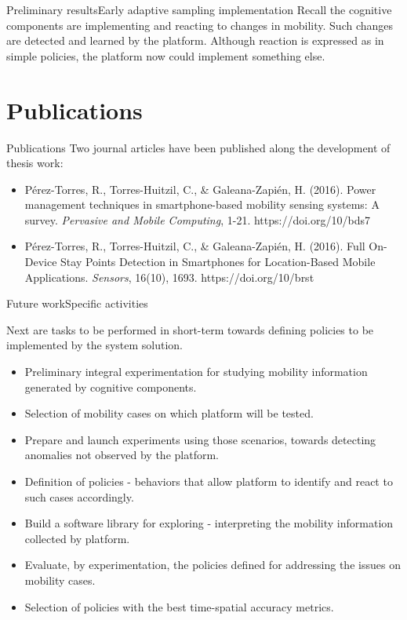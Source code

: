 \documentclass[9pt,xcolor={dvipsnames},handout]{beamer}
\begin{document}
\begin{frame}{Preliminary results}{Early adaptive sampling implementation}
Recall the cognitive components are implementing and reacting to changes in mobility.
Such changes are detected and learned by the platform.
Although reaction is expressed as in simple policies, the platform now could implement something else.
\end{frame}



\section{Publications}
\begin{frame}{Publications}{}
Two journal articles have been published along the development of thesis work:
\begin{itemize}
  \item Pérez-Torres, R., Torres-Huitzil, C., \& Galeana-Zapién, H. (2016). Power management techniques in smartphone-based mobility sensing systems: A survey. \emph{Pervasive and Mobile Computing}, 1-21. https://doi.org/10/bds7 \cite{Perez-Torres2016}

  \item Pérez-Torres, R., Torres-Huitzil, C., \& Galeana-Zapién, H. (2016). Full On-Device Stay Points Detection in Smartphones for Location-Based Mobile Applications. \emph{Sensors}, 16(10), 1693. https://doi.org/10/brst \cite{Perez-Torres2016b} 
\end{itemize}
\end{frame}

\begin{frame}{Future work}{Specific activities}
{
\small{}
Next are tasks to be performed in short-term towards defining policies to be implemented by the system solution.
\begin{itemize}
  \item Preliminary integral experimentation for studying mobility information generated by cognitive components.
  \item Selection of mobility cases on which platform will be tested.
  \item Prepare and launch experiments using those scenarios, towards detecting anomalies not observed by the platform.
  \item Definition of policies - behaviors that allow platform to identify and react to such cases accordingly.
  \item Build a software library for exploring - interpreting the mobility information collected by platform.
  \item Evaluate, by experimentation, the policies defined for addressing the issues on mobility cases.
  \item Selection of policies with the best time-spatial accuracy metrics.
\end{itemize}
}
\end{frame}
\end{document}
